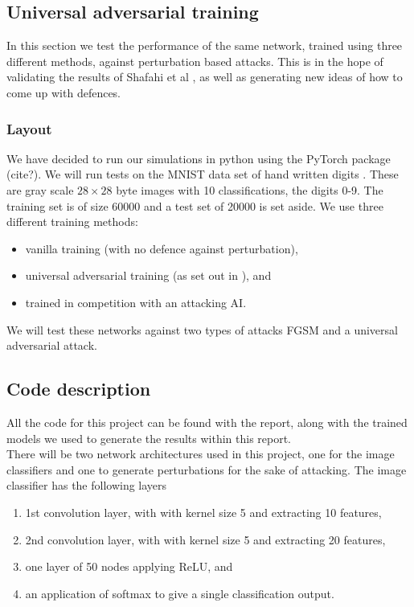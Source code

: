 \subsection{Universal adversarial training}

\setlength\parindent{0pt}

In this section we test the performance of the same network, trained using three different methods, against perturbation based attacks. This is in the hope of validating the results of Shafahi et al \cite{shafahi_universal_2018}, as well as generating new ideas of how to come up with defences.

\subsubsection{Layout}

We have decided to run our simulations in python using the PyTorch package (cite?). We will run tests on the MNIST data set of hand written digits \cite{EMNIST_data}. These are gray scale $28 \times 28$ byte images with 10 classifications, the digits 0-9. The training set is of size 60000 and a test set of 20000 is set aside. We use three different training methods:

\begin{itemize}
	\item vanilla training (with no defence against perturbation),
	\item universal adversarial training (as set out in \cite{shafahi_universal_2018}), and
	\item trained in competition with an attacking AI.
\end{itemize}

We will test these networks against two types of attacks FGSM and a universal adversarial attack.

\subsection{Code description}

All the code for this project can be found with the report, along with the trained models we used to generate the results within this report.\\ 

There will be two network architectures used in this project, one for the image classifiers and one to generate perturbations for the sake of attacking. The image classifier has the following layers

\begin{enumerate}
	\item 1st convolution layer, with with kernel size 5 and extracting 10 features,
	\item 2nd convolution layer, with with kernel size 5 and extracting 20 features,
	\item one layer of 50 nodes applying ReLU, and
	\item an application of softmax to give a single classification output.
\end{enumerate}

